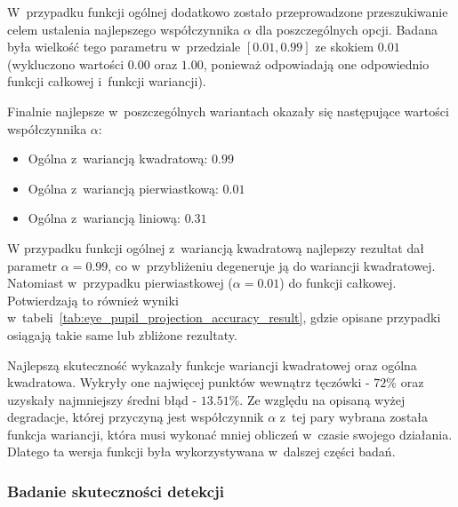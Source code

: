 W~przypadku funkcji ogólnej dodatkowo zostało przeprowadzone przeszukiwanie celem ustalenia najlepszego współczynnika $\alpha$ dla poszczególnych opcji. Badana była wielkość tego parametru w~przedziale $[0.01, 0.99]$ ze skokiem $0.01$ (wykluczono wartości $0.00$ oraz $1.00$, ponieważ odpowiadają one odpowiednio funkcji całkowej i~funkcji wariancji).

\par

Finalnie najlepsze w~poszczególnych wariantach okazały się następujące wartości współczynnika $\alpha$:

\begin{itemize}
    \item Ogólna z~wariancją kwadratową: $0.99$
    \item Ogólna z~wariancją pierwiastkową: $0.01$
    \item Ogólna z~wariancją liniową: $0.31$
\end{itemize}

W przypadku funkcji ogólnej z~wariancją kwadratową najlepszy rezultat dał parametr $\alpha=0.99$, co w~przybliżeniu degeneruje ją do wariancji kwadratowej. Natomiast w~przypadku pierwiastkowej ($\alpha=0.01$) do funkcji całkowej. Potwierdzają to również wyniki w~tabeli~\ref{tab:eye_pupil_projection_accuracy_result}, gdzie opisane przypadki osiągają takie same lub zbliżone rezultaty.



Najlepszą skuteczność wykazały funkcje wariancji kwadratowej oraz ogólna kwadratowa. Wykryły one najwięcej punktów wewnątrz tęczówki - $72\%$ oraz uzyskały najmniejszy średni błąd - $13.51\%$. Ze względu na opisaną wyżej degradacje, której przyczyną jest współczynnik $\alpha$ z~tej pary wybrana została funkcja wariancji, która musi wykonać mniej obliczeń w~czasie swojego działania. Dlatego ta wersja funkcji była wykorzystywana w~dalszej części badań.

\subsubsection{Badanie skuteczności detekcji}










